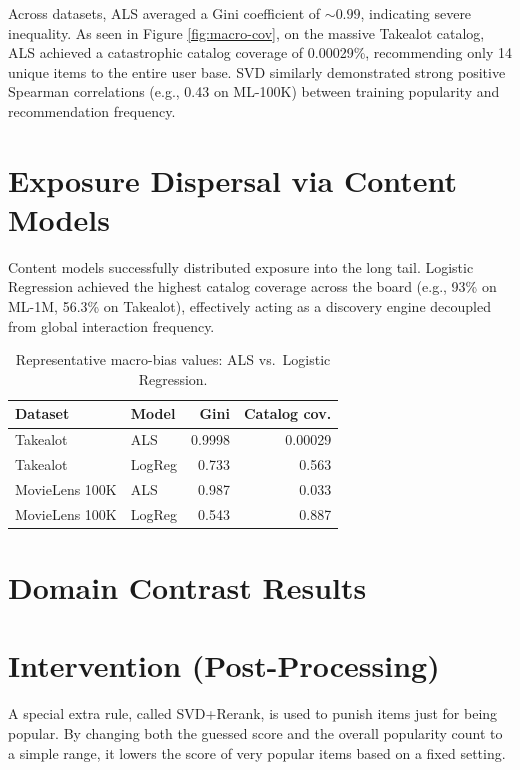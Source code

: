 \documentclass[11pt,a4paper]{report}
\begin{document}
Across datasets, ALS averaged a Gini coefficient of $\sim 0.99$, indicating severe inequality. As seen in Figure \ref{fig:macro-cov}, on the massive Takealot catalog, ALS achieved a catastrophic catalog coverage of 0.00029\%, recommending only 14 unique items to the entire user base. SVD similarly demonstrated strong positive Spearman correlations (e.g., 0.43 on ML-100K) between training popularity and recommendation frequency.

\section{Exposure Dispersal via Content Models}
Content models successfully distributed exposure into the long tail. Logistic Regression achieved the highest catalog coverage across the board (e.g., 93\% on ML-1M, 56.3\% on Takealot), effectively acting as a discovery engine decoupled from global interaction frequency.

\begin{table}[htbp]
  \centering
  \caption{Representative macro-bias values: ALS vs.\ Logistic Regression.}
  \label{tab:macro-numbers}
  \begin{tabular}{@{}llrr@{}}
    \toprule
    \textbf{Dataset} & \textbf{Model} & \textbf{Gini} & \textbf{Catalog cov.} \\
    \midrule
    Takealot & ALS & 0.9998 & 0.00029 \\
    Takealot & LogReg & 0.733 & 0.563 \\
    MovieLens 100K & ALS & 0.987 & 0.033 \\
    MovieLens 100K & LogReg & 0.543 & 0.887 \\
    \bottomrule
  \end{tabular}
\end{table}

\section{Domain Contrast Results}

\section{Intervention (Post-Processing)}
A special extra rule, called SVD+Rerank, is used to punish items just for being popular. By changing both the guessed score and the overall popularity count to a simple range, it lowers the score of very popular items based on a fixed setting.
\end{document}
